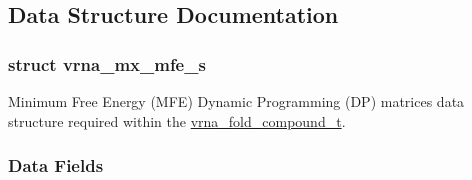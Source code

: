 \subsection{Data Structure Documentation}
\label{structvrna__mx__mfe__s}
\subsubsection{struct vrna\+\_\+mx\+\_\+mfe\+\_\+s}
Minimum Free Energy (M\+FE) Dynamic Programming (DP) matrices data structure required within the \mbox{\hyperlink{group__fold__compound_ga1b0cef17fd40466cef5968eaeeff6166}{vrna\+\_\+fold\+\_\+compound\+\_\+t}}. \subsubsection*{Data Fields}
